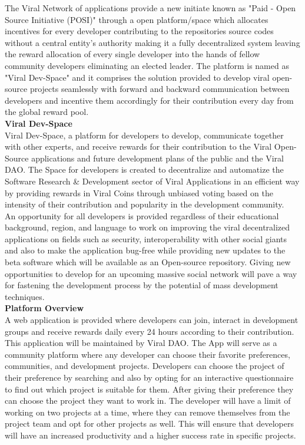 \documentclass[conference]{IEEEtran}
\begin{document}
The Viral Network of applications provide a new initiate known as "Paid - Open Source Initiative (POSI)" through a open platform/space which allocates incentives for every developer contributing to the repositories source codes without a central entity's authority making it a fully decentralized system leaving the reward allocation of every single developer into the hands of fellow community developers eliminating an elected leader. The platform is named as "Viral Dev-Space" and it comprises the solution provided to develop viral open-source projects seamlessly with forward and backward communication between developers and incentive them accordingly for their contribution every day from the global reward pool.\\

\textbf{Viral Dev-Space}\\

Viral Dev-Space, a platform for developers to develop, communicate together with other experts, and receive rewards for their contribution to the Viral Open-Source applications and future development plans of the public and the Viral DAO. The Space for developers is created to decentralize and automatize the Software Research \& Development sector of Viral Applications in an efficient way by providing rewards in Viral Coins through unbiased voting based on the intensity of their contribution and popularity in the development community.\\

An opportunity for all developers is provided regardless of their educational background, region, and language to work on improving the viral decentralized applications on fields such as security, interoperability with other social giants and also to make the application bug-free while providing new updates to the beta software which will be available as an Open-source repository. Giving new opportunities to develop for an upcoming massive social network will pave a way for fastening the development process by the potential of mass development techniques.\\


\textbf{Platform Overview}\\

A web application is provided where developers can join, interact in development groups and receive rewards daily every 24 hours according to their contribution. This application will be maintained by Viral DAO. The App will serve as a community platform where any developer can choose their favorite preferences, communities, and development projects. Developers can choose the project of their preference by searching and also by opting for an interactive questionnaire to find out which project is suitable for them. After giving their preference they can choose the project they want to work in. The developer will have a limit of working on two projects at a time, where they can remove themselves from the project team and opt for other projects as well. This will ensure that developers will have an increased productivity and a higher success rate in specific projects.\\
\end{document}
